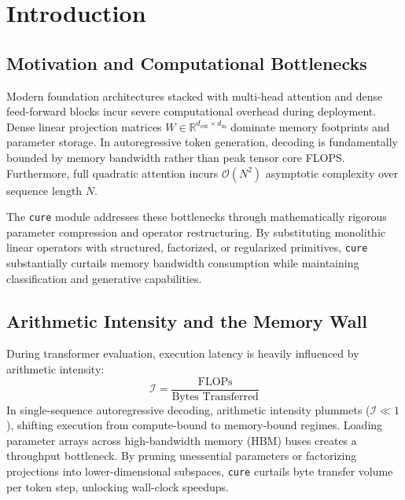 \section{Introduction}

\subsection{Motivation and Computational Bottlenecks}
Modern foundation architectures stacked with multi-head attention and dense feed-forward blocks incur severe computational overhead during deployment. Dense linear projection matrices $W \in \mathbb{R}^{d_{\text{out}} \times d_{\text{in}}}$ dominate memory footprints and parameter storage. In autoregressive token generation, decoding is fundamentally bounded by memory bandwidth rather than peak tensor core FLOPS. Furthermore, full quadratic attention incurs $\mathcal{O}(N^2)$ asymptotic complexity over sequence length $N$.

The \texttt{cure} module addresses these bottlenecks through mathematically rigorous parameter compression and operator restructuring. By substituting monolithic linear operators with structured, factorized, or regularized primitives, \texttt{cure} substantially curtails memory bandwidth consumption while maintaining classification and generative capabilities.

\subsection{Arithmetic Intensity and the Memory Wall}
During transformer evaluation, execution latency is heavily influenced by arithmetic intensity:
\[
\mathcal{I} = \frac{\text{FLOPs}}{\text{Bytes Transferred}}
\]
In single-sequence autoregressive decoding, arithmetic intensity plummets ($\mathcal{I} \ll 1$), shifting execution from compute-bound to memory-bound regimes. Loading parameter arrays across high-bandwidth memory (HBM) buses creates a throughput bottleneck. By pruning unessential parameters or factorizing projections into lower-dimensional subspaces, \texttt{cure} curtails byte transfer volume per token step, unlocking wall-clock speedups.

